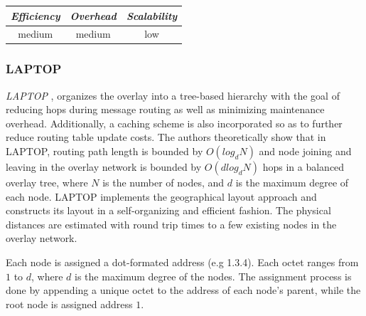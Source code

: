 \begin{center}
\begin{tabular}{ccc}
\emph{Efficiency} & \emph{Overhead} & \emph{Scalability} \\
\hline
medium &
medium &
low
\end{tabular}
\end{center}

\subsubsection{LAPTOP}
\emph{LAPTOP} \cite{WLH2007}, organizes the overlay into a tree-based hierarchy
with the goal of reducing hops during message routing as well as minimizing
maintenance overhead. Additionally, a caching scheme is also incorporated so as
to further reduce routing table update costs. The authors theoretically show
that in LAPTOP, routing path length is bounded by $O(log_d N)$ and node joining
and leaving in the overlay network is bounded by $O\left( d log_d N \right)$
hops in a balanced overlay tree, where $N$ is the number of nodes, and $d$ is
the maximum degree of each node. LAPTOP implements the geographical layout
approach  and constructs its layout in a self-organizing and efficient fashion.
The physical distances are estimated with round trip times to a few existing
nodes in the overlay network.

Each node is assigned a dot-formated address (e.g 1.3.4). Each octet ranges from
$1$ to $d$, where $d$ is the maximum degree of the nodes. The assignment process
is done by appending a unique octet to the address of each node's parent, while
the root node is assigned address $1$.

